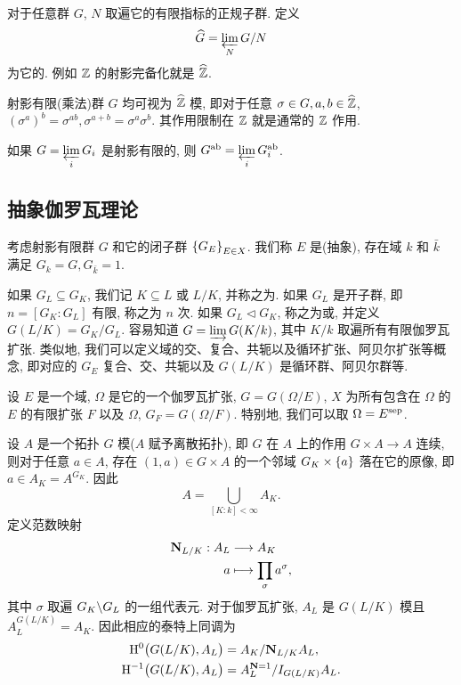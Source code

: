 \begin{example}
对于任意群 $G$, $N$ 取遍它的有限指标的正规子群. 定义
  \[\widehat G=\varprojlim\limits_N G/N\]
为它的. 例如 ${\mathbb{Z}}$ 的射影完备化就是 $\widehat {{\mathbb{Z}}}$.
\end{example}

\begin{exercise}
射影有限(乘法)群 $G$ 均可视为 $\widehat {{\mathbb{Z}}}$ 模, 即对于任意 $\sigma\in G,a,b\in\widehat{{\mathbb{Z}}}$, $(\sigma^a)^b=\sigma^{ab},\sigma^{a+b}=\sigma^a\sigma^b$. 其作用限制在 ${\mathbb{Z}}$ 就是通常的 ${\mathbb{Z}}$ 作用.
\end{exercise}

\begin{exercise}
如果 $G=\varprojlim\limits_i G_i$ 是射影有限的, 则 $G^{\mathrm{ab}}=\varprojlim\limits_i G_i^{\mathrm{ab}}$.
\end{exercise}


\subsection{抽象伽罗瓦理论}
考虑射影有限群 $G$ 和它的闭子群 $\left\{G_E\right\}_{E\in X}$. 我们称 $E$ 是(抽象), 存在域 $k$ 和 $\bar k$ 满足 $G_k=G,G_{\bar k}=1$. 

如果 $G_L\subseteq G_K$, 我们记 $K\subseteq L$ 或 $L/K$, 并称之为. 如果 $G_L$ 是开子群, 即 $n=[G_K:G_L]$ 有限, 称之为 $n$ 次. 如果 $G_L\triangleleft G_K$, 称之为或, 并定义 $G(L/K)=G_K/G_L$. 容易知道 $G=\varinjlim\limits G(K/k)$, 其中 $K/k$ 取遍所有有限伽罗瓦扩张. 类似地, 我们可以定义域的交、复合、共轭以及循环扩张、阿贝尔扩张等概念, 即对应的 $G_E$ 复合、交、共轭以及 $G(L/K)$ 是循环群、阿贝尔群等.

\begin{example}
设 $E$ 是一个域, $\Omega$ 是它的一个伽罗瓦扩张, $G=G(\Omega/E)$, $X$ 为所有包含在 $\Omega$ 的 $E$ 的有限扩张 $F$ 以及 $\Omega$, $G_F=G(\Omega/F)$. 特别地, 我们可以取 $\Omega=E^{\mathrm{sep}}$.
\end{example}

设 $A$ 是一个拓扑 $G$ 模($A$ 赋予离散拓扑), 即 $G$ 在 $A$ 上的作用 $G\times A\to A$ 连续, 则对于任意 $a\in A$, 存在 $(1,a)\in G\times A$ 的一个邻域 $G_K\times \left\{a\right\}$ 落在它的原像, 即 $a\in A_K=A^{G_K}$. 因此
  \[A=\bigcup_{[K:k]<\infty} A_K.\]
定义范数映射
  \[\begin{split}{\mathbf{N}}_{L/K}: A_L &\longrightarrow A_K \\ a &\longmapsto \prod_\sigma a^\sigma,\end{split}\]
其中 $\sigma$ 取遍 $G_K\backslash G_L$ 的一组代表元. 对于伽罗瓦扩张, $A_L$ 是 $G(L/K)$ 模且 $A_L^{G(L/K)}=A_K$.
因此相应的泰特上同调为
  \[\begin{split}
	{\mathrm{H}}^0\bigl(G(L/K),A_L\bigr)&=A_K/{\mathbf{N}}_{L/K}A_L,\\
	{\mathrm{H}}^{-1}\bigl(G(L/K),A_L\bigr)&=A_L^{{\mathbf{N}}=1}/I_{G(L/K)} A_L.
	\end{split}\]

